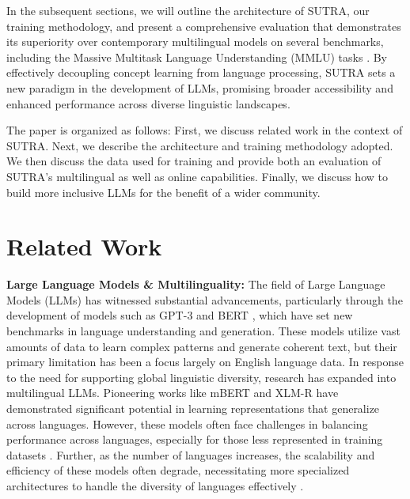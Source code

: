 \documentclass{article}
\begin{document}
In the subsequent sections, we will outline the architecture of SUTRA, our training methodology, and present a comprehensive evaluation that demonstrates its superiority over contemporary multilingual models on several benchmarks, including the Massive Multitask Language Understanding (MMLU) tasks \citep{hendrycks2021measuring}.
By effectively decoupling concept learning from language processing, SUTRA sets a new paradigm in the development of LLMs, promising broader accessibility and enhanced performance across diverse linguistic landscapes.

The paper is organized as follows: First, we discuss related work in the context of SUTRA. Next, we describe the architecture and training methodology adopted. We then discuss the data used for training and provide both an evaluation of SUTRA's multilingual as well as online capabilities.
Finally, we discuss how to build more inclusive LLMs for the benefit of a wider community.

\section{Related Work}

\textbf{Large Language Models \& Multilinguality:} The field of Large Language Models (LLMs) has witnessed substantial advancements, particularly through the development of models such as GPT-3 \citep{brown2020language} and BERT \citep{devlin2018bert}, which have set new benchmarks in language understanding and generation. These models utilize vast amounts of data to learn complex patterns and generate coherent text, but their primary limitation has been a focus largely on English language data.
In response to the need for supporting global linguistic diversity, research has expanded into multilingual LLMs.
Pioneering works like mBERT \citep{devlin2018bert} and XLM-R \citep{conneau2020unsupervised} have demonstrated significant potential in learning representations that generalize across languages.
However, these models often face challenges in balancing performance across languages, especially for those less represented in training datasets \citep{conneau2020unsupervised}. Further, as the number of languages increases, the scalability and efficiency of these models often degrade, necessitating more specialized architectures to handle the diversity of languages effectively \citep{smith2021can}.
\end{document}
